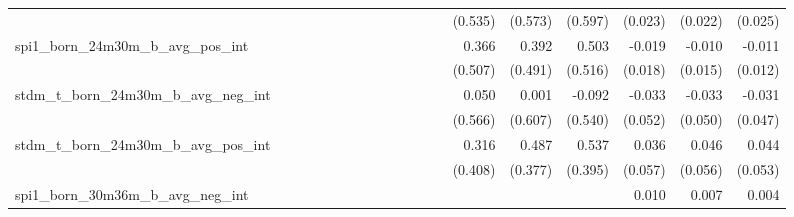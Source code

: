 \begin{tabular}{lrrrrrrrrrrrrrrrrrr}
                                            &              &              &              &              &              &              &              &              &               &              &              &               &      (0.535) &      (0.573) &       (0.597) &      (0.023) &      (0.022) &       (0.025) \\ 
spi1\_born\_24m30m\_b\_avg\_pos\_int        &              &              &              &              &              &              &              &              &               &              &              &               &        0.366 &        0.392 &         0.503 &       -0.019 &       -0.010 &        -0.011 \\ 
                                            &              &              &              &              &              &              &              &              &               &              &              &               &      (0.507) &      (0.491) &       (0.516) &      (0.018) &      (0.015) &       (0.012) \\ 
stdm\_t\_born\_24m30m\_b\_avg\_neg\_int     &              &              &              &              &              &              &              &              &               &              &              &               &        0.050 &        0.001 &        -0.092 &       -0.033 &       -0.033 &        -0.031 \\ 
                                            &              &              &              &              &              &              &              &              &               &              &              &               &      (0.566) &      (0.607) &       (0.540) &      (0.052) &      (0.050) &       (0.047) \\ 
stdm\_t\_born\_24m30m\_b\_avg\_pos\_int     &              &              &              &              &              &              &              &              &               &              &              &               &        0.316 &        0.487 &         0.537 &        0.036 &        0.046 &         0.044 \\ 
                                            &              &              &              &              &              &              &              &              &               &              &              &               &      (0.408) &      (0.377) &       (0.395) &      (0.057) &      (0.056) &       (0.053) \\ 
spi1\_born\_30m36m\_b\_avg\_neg\_int        &              &              &              &              &              &              &              &              &               &              &              &               &              &              &               &        0.010 &        0.007 &         0.004 \\ 

\end{tabular}
